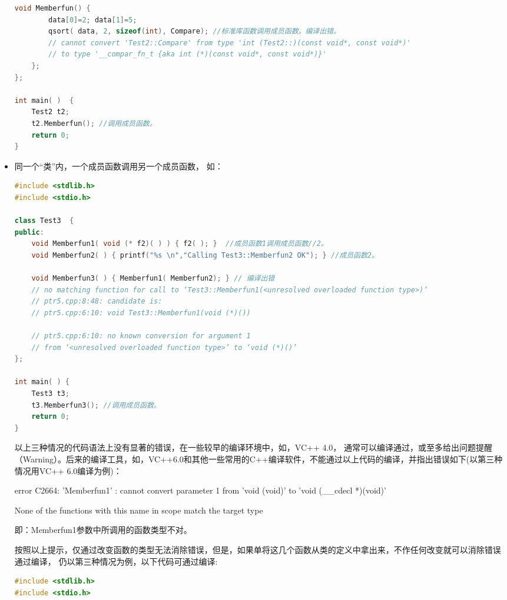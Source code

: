 \documentclass{article}
\begin{document}
\begin{CJK}{UTF8}{gbsn}
\begin{itemize}
\begin{lstlisting}[language=c++]
    void Memberfun() {       
        data[0]=2; data[1]=5;  
        qsort( data, 2, sizeof(int), Compare); //标准库函数调用成员函数。编译出错。
        // cannot convert 'Test2::Compare' from type 'int (Test2::)(const void*, const void*)'
        // to type '__compar_fn_t {aka int (*)(const void*, const void*)}'
    };
};  

int main( )  {  
    Test2 t2;  
    t2.Memberfun(); //调用成员函数。  
    return 0;  
}  
\end{lstlisting}
  
\item 同一个“类”内，一个成员函数调用另一个成员函数， 如：
\begin{lstlisting}[language=c++]
#include <stdlib.h>
#include <stdio.h>

class Test3  {  
public:  
    void Memberfun1( void (* f2)( ) ) { f2( ); }  //成员函数1调用成员函数//2。  
    void Memberfun2( ) { printf("%s \n","Calling Test3::Memberfun2 OK"); } //成员函数2。  

    void Memberfun3( ) { Memberfun1( Memberfun2); } // 编译出错
    // no matching function for call to ‘Test3::Memberfun1(<unresolved overloaded function type>)’
    // ptr5.cpp:8:48: candidate is:
    // ptr5.cpp:6:10: void Test3::Memberfun1(void (*)())
    
    // ptr5.cpp:6:10: no known conversion for argument 1
    // from ‘<unresolved overloaded function type>’ to ‘void (*)()’
};  

int main( ) {  
    Test3 t3;  
    t3.Memberfun3(); //调用成员函数。  
    return 0;  
} 
\end{lstlisting}

以上三种情况的代码语法上没有显著的错误，在一些较早的编译环境中，如，VC++ 4.0， 通常可以编译通过，或至多给出问题提醒（Warning）。后来的编译工具，如，VC++6.0和其他一些常用的C++编译软件，不能通过以上代码的编译，并指出错误如下(以第三种情况用VC++ 6.0编译为例)：

error C2664: 'Memberfun1' : cannot convert parameter 1 from 'void (void)' to 'void (\_\_cdecl *)(void)'

None of the functions with this name in scope match the target type

即：Memberfun1参数中所调用的函数类型不对。

按照以上提示，仅通过改变函数的类型无法消除错误，但是，如果单将这几个函数从类的定义中拿出来，不作任何改变就可以消除错误通过编译， 仍以第三种情况为例，以下代码可通过编译:
\begin{lstlisting}[language=c++]
#include <stdlib.h>
#include <stdio.h>


\end{lstlisting}
\end{itemize}
\end{CJK}
\end{document}
